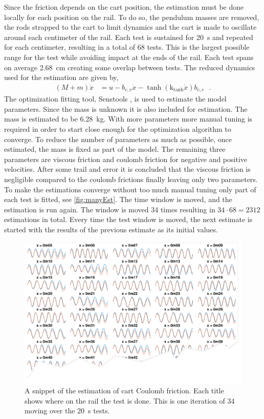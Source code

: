 Since the friction depends on the cart position, the estimation must be done locally for each position on the rail. To do so, the pendulum masses are removed, the rods strapped to the cart to limit dynamics and the cart is made to oscillate around each centimeter of the rail. Each test is sustained for \SI{20}{s} and repeated for each centimeter, resulting in a total of 68 tests. This is the largest possible range for the test while avoiding impact at the ends of the rail. Each test spans on average \SI{2.68}{cm} creating some overlap between tests. The reduced dynamics used for the estimation are given by,
\begin{align}
  ( M + m )\ddot{x} &=  u - b_{c,v} \dot{x} - \tanh(\text{k}_\text{tanh}\dot{x}) b_{c,c} \ \ \ .
  \label{eq:reducedForCartEstimation}
\end{align}
%
The optimization fitting tool, Senstools \cite{MHKnudsen}, is used to estimate the model parameters. Since the mass is unknown it is also included for estimation. The mass is estimated to be \SI{6.28}{kg}. With more parameters more manual tuning is required in order to start close enough for the optimization algorithm to converge. To reduce the number of parameters as much as possible, once estimated, the mass is fixed as part of the model. The remaining three parameters are viscous friction and coulomb friction for negative and positive velocities. After some trail and error it is concluded that the viscous friction is negligible compared to the coulomb frictions finally leaving only two parameters.\\
To make the estimations converge without too much manual tuning only part of each test is fitted, see \autoref{fig:manyEst}. The time window is moved, and the estimation is run again. The window is moved \num{34} times resulting in $34\cdot68 = 2312$ estimations in total. Every time the test window is moved, the next estimate is started with the results of the previous estimate as its initial values.
%
\begin{figure}[H]
  \includegraphics[width=.6\textwidth]{figures/manyEst_tear}
  \caption{A snippet of the estimation of cart Coulomb friction. Each title shows where on the rail the test is done. This is one iteration of 34 moving over the \SI{20}{s} tests.}
  \label{fig:manyEst}
\end{figure}
